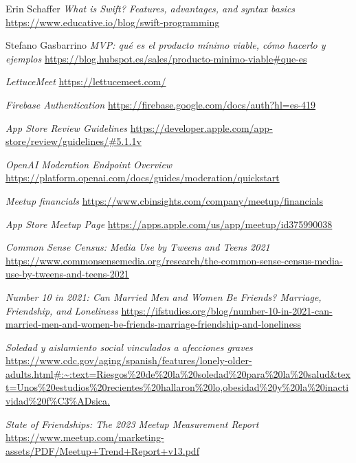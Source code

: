 
\begin{thebibliography}{9}
    Erin Schaffer
    \textit{What is Swift? Features, advantages, and syntax basics}
    \url{https://www.educative.io/blog/swift-programming}

    Stefano Gasbarrino
    \textit{MVP: qué es el producto mínimo viable, cómo hacerlo y ejemplos}
    \url{https://blog.hubspot.es/sales/producto-minimo-viable#que-es}

    \textit{LettuceMeet}
    \url{https://lettucemeet.com/}

    \textit{Firebase Authentication}
    \url{https://firebase.google.com/docs/auth?hl=es-419}

    \textit{App Store Review Guidelines}
    \url{https://developer.apple.com/app-store/review/guidelines/#5.1.1v}

    \textit{OpenAI Moderation Endpoint Overview}
    \url{https://platform.openai.com/docs/guides/moderation/quickstart}

    \textit{Meetup financials}
    \url{https://www.cbinsights.com/company/meetup/financials}

    \textit{App Store Meetup Page}
    \url{https://apps.apple.com/us/app/meetup/id375990038}

    \textit{Common Sense Census: Media Use by Tweens and Teens 2021}
    \url{https://www.commonsensemedia.org/research/the-common-sense-census-media-use-by-tweens-and-teens-2021}

    \textit{Number 10 in 2021: Can Married Men and Women Be Friends? Marriage, Friendship, and Loneliness}
    \url{https://ifstudies.org/blog/number-10-in-2021-can-married-men-and-women-be-friends-marriage-friendship-and-loneliness}

    \textit{Soledad y aislamiento social vinculados a afecciones graves}
    \url{https://www.cdc.gov/aging/spanish/features/lonely-older-adults.html#:~:text=Riesgos%20de%20la%20soledad%20para%20la%20salud&text=Unos%20estudios%20recientes%20hallaron%20lo,obesidad%20y%20la%20inactividad%20f%C3%ADsica.}

    \textit{State of Friendships: The 2023 Meetup Measurement Report}
    \url{https://www.meetup.com/marketing-assets/PDF/Meetup+Trend+Report+v13.pdf}

\end{thebibliography}